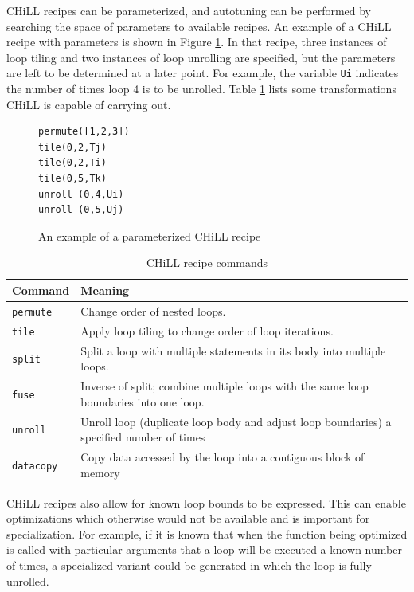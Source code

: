\documentclass[msthesis,justified,copyright,final,numbers,sort&compress,
gsmodern,amstex,natbib]{uothesis}
\begin{document}
CHiLL recipes can be parameterized, and autotuning can be performed by searching the space of parameters to available recipes. An example of a CHiLL recipe with parameters is shown in Figure \ref{fig:chill-script}. In that recipe, three instances of loop tiling and two instances of loop unrolling are specified, but the parameters are left to be determined at a later point. For example, the variable \texttt{Ui} indicates the number of times loop 4 is to be unrolled. Table \ref{tab:chill-commands} lists some transformations CHiLL is capable of carrying out.

\begin{figure}[tbp]
\centering
\begin{verbatim}
permute([1,2,3])
tile(0,2,Tj)
tile(0,2,Ti)
tile(0,5,Tk)
unroll (0,4,Ui)
unroll (0,5,Uj)
\end{verbatim}
\caption{An example of a parameterized CHiLL recipe}
\label{fig:chill-script}
\end{figure}

\begin{table}[tbp]
\begin{center}
\begin{tabular}{ l | l }
\hline
Command & Meaning \\
\hline
\texttt{permute} & Change order of nested loops. \\
\texttt{tile} & Apply loop tiling to change order of loop iterations. \\
\texttt{split} & Split a loop with multiple statements in its body into multiple loops. \\
\texttt{fuse} & Inverse of split; combine multiple loops with the same loop boundaries into one loop. \\
\texttt{unroll} & Unroll loop (duplicate loop body and adjust loop boundaries) a specified number of times \\
\texttt{datacopy} & Copy data accessed by the loop into a contiguous block of memory \\
\hline
\end{tabular}
\end{center}
\caption{CHiLL recipe commands}
\label{tab:chill-commands}
\end{table}

CHiLL recipes also allow for known loop bounds to be expressed. This can enable optimizations which otherwise would not be available and is important for specialization. For example, if it is known that when the function being optimized is called with particular arguments that a loop will be executed a known number of times, a specialized variant could be generated in which the loop is fully unrolled.
\end{document}
